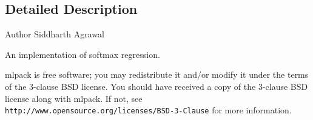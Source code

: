 \subsection{Detailed Description}
\begin{DoxyAuthor}{Author}
Siddharth Agrawal
\end{DoxyAuthor}
An implementation of softmax regression.

mlpack is free software; you may redistribute it and/or modify it under the terms of the 3-\/clause B\+SD license. You should have received a copy of the 3-\/clause B\+SD license along with mlpack. If not, see {\tt http\+://www.\+opensource.\+org/licenses/\+B\+S\+D-\/3-\/\+Clause} for more information. 